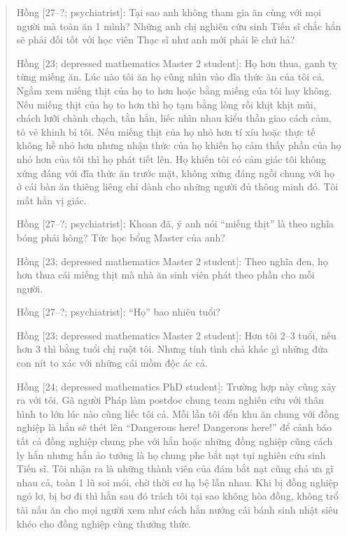 \documentclass[12pt]{article}
\begin{document}
\begin{quotation}
	{\sf Hồng [27--?; psychiatrist]}: Tại sao anh không tham gia ăn cùng với mọi người mà toàn ăn 1 mình? Những anh chị nghiên cứu sinh Tiến sĩ chắc hẳn sẽ phải đối tốt với học viên Thạc sĩ như anh mới phải lẽ chứ hả?
	
	{\sf Hồng [23; depressed mathematics Master 2 student]}: Họ hơn thua, ganh tỵ từng miếng ăn. Lúc nào tôi ăn họ cũng nhìn vào đĩa thức ăn của tôi cả. Ngắm xem miếng thịt của họ to hơn hoặc bằng miếng của tôi hay không. Nếu miếng thịt của họ to hơn thì họ tạm bằng lòng rồi khịt khịt mũi, chách lưỡi chành chạch, tằn hắn, liếc nhìn nhau kiểu thần giao cách cảm, tỏ vẻ khinh bỉ tôi. Nếu miếng thịt của họ nhỏ hơn tí xíu hoặc thực tế không hề nhỏ hơn nhưng nhận thức của họ khiến họ cảm thấy phần của họ nhỏ hơn của tôi thì họ phát tiết lên. Họ khiến tôi có cảm giác tôi không xứng đáng với đĩa thức ăn trước mặt, không xứng đáng ngồi chung với họ ở cái bàn ăn thiêng liêng chỉ dành cho những người đủ thông minh đó. Tôi mất hẳn vị giác.
	
	{\sf Hồng [27--?; psychiatrist]}: Khoan đã, ý anh nói ``miếng thịt'' là theo nghĩa bóng phải hông? Tức học bổng Master của anh?
	
	{\sf Hồng [23; depressed mathematics Master 2 student]}: Theo nghĩa đen, họ hơn thua cái miếng thịt mà nhà ăn sinh viên phát theo phần cho mỗi người.
	
	{\sf Hồng [27--?; psychiatrist]}: ``Họ'' bao nhiêu tuổi?
	
	{\sf Hồng [23; depressed mathematics Master 2 student]}: Hơn tôi 2--3 tuổi, nếu hơn 3 thì bằng tuổi chị ruột tôi. Nhưng tính tình chả khác gì những đứa con nít to xác với những cái mồm độc ác cả.
	
	{\sf Hồng [24; depressed mathematics PhD student]}: Trường hợp này cũng xảy ra với tôi. Gã người Pháp làm postdoc chung team nghiên cứu với thân hình to lớn lúc nào cũng liếc tôi cả. Mỗi lần tôi đến khu ăn chung với đồng nghiệp là hắn sẽ thét lên ``Dangerous here! Dangerous here!'' để cảnh báo tất cả đồng nghiệp chung phe với hắn hoặc những đồng nghiệp cũng cách ly hắn nhưng hắn ảo tưởng là họ chung phe bắt nạt tụi nghiên cứu sinh Tiến sĩ. Tôi nhận ra là những thành viên của đám bắt nạt cũng chả ưa gì nhau cả, toàn 1 lũ soi mói, chờ thời cơ hạ bệ lẫn nhau. Khi bị đồng nghiệp ngó lơ, bị bơ đi thì hắn sau đó trách tôi tại sao không hòa đồng, không trổ tài nấu ăn cho mọi người xem như cách hắn nướng cái bánh sinh nhật siêu khéo cho đồng nghiệp cùng thưởng thức.
	

\end{quotation}
\end{document}
